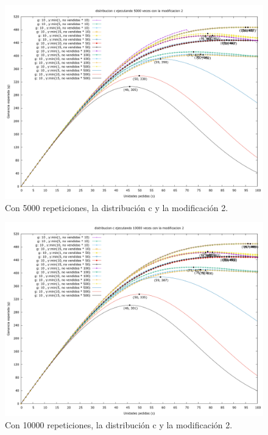 \documentclass[12pt, spanish]{article}
\begin{document}
\begin{figure}[H]
	\centering
	\includegraphics[scale = 0.2]{prob_c/datos_c_5000_2.png}
	\caption{Con 5000 repeticiones, la distribución c y la modificación 2.}
	\label{fig:ej1_a_5000}

\end{figure}


\begin{figure}[H]
	\centering
	\includegraphics[scale = 0.2]{prob_c/datos_c_10000_2.png}
	\caption{Con 10000 repeticiones, la distribución c y la modificación 2.}
	\label{fig:ej1_a_10000}

\end{figure}
\end{document}
